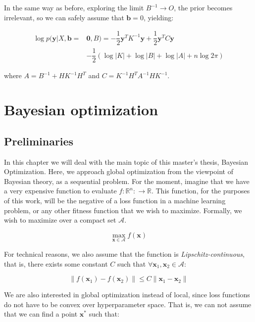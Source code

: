 \documentclass[10pt,a4paper,twoside]{book}
\begin{document}
In the same way as before, exploring the limit $B^{-1} \rightarrow O$, the prior becomes irrelevant, so we can safely assume that $\boldsymbol{b} = 0$, yielding:

\begin{align}
\log p(\boldsymbol{y}|X, \boldsymbol{b} =& \boldsymbol{0}, B) = -\dfrac{1}{2}\boldsymbol{y}^T K^{-1}\boldsymbol{y} + \dfrac{1}{2}\boldsymbol{y}^T C \boldsymbol{y}\\
&- \dfrac{1}{2}\left(\log |K| + \log |B| + \log |A| + n\log 2\pi \right)
\end{align}

where $A = B^{-1} + HK^{-1}H^T$ and $C = K^{-1}H^T A^{-1}HK^{-1}$.

\chapter{Bayesian optimization}

\section{Preliminaries}

In this chapter we will deal with the main topic of this master's thesis, Bayesian Optimization. Here, we approach global optimization from the viewpoint of Bayesian theory, as a sequential problem. For the moment, imagine that we have a very expensive function to evaluate $f:\mathbb{R}^n: \rightarrow \mathbb{R}$. This function, for the purposes of this work, will be the negative of a loss function in a machine learning problem, or any other fitness function that we wish to maximize. Formally, we wish to maximize over a compact set $\mathcal{A}$.

\begin{equation}
\max_{\boldsymbol{x}\in \mathcal{A}} f(\boldsymbol{x})
\end{equation}

For technical reasons, we also assume that the function is \textit{Lipschitz-continuous}, that is, there exists some constant $C$ such that $\forall \boldsymbol{x}_1, \boldsymbol{x}_2 \in \mathcal{A}$:

\begin{equation}
\lVert f(\boldsymbol{x}_1) - f(\boldsymbol{x}_2) \rVert \leq C \lVert \boldsymbol{x}_1  - \boldsymbol{x}_2\rVert
\end{equation}

We are also interested in global optimization instead of local, since loss functions do not have to be convex over hyperparameter space. That is, we can not assume that we can find a point $\boldsymbol{x^{*}}$ such that:
\end{document}
